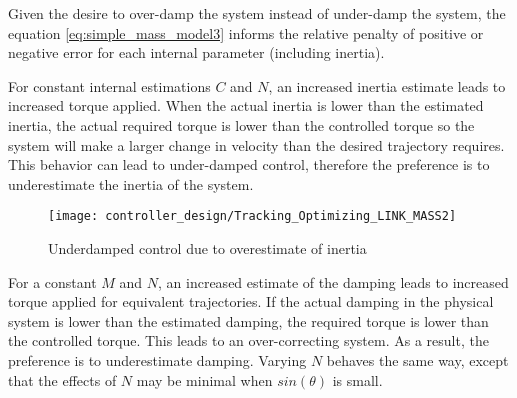 Given the desire to over-damp the system instead of under-damp the system, the
equation \ref{eq:simple_mass_model3} informs the relative penalty of positive or negative error for
each internal parameter (including inertia).

For constant internal estimations $C$ and $N$, an increased inertia estimate leads to increased torque
applied. When the actual inertia is lower than the estimated inertia, the actual required torque is lower 
than the controlled torque so the system will make a larger change in velocity 
than the desired trajectory requires. This behavior can lead to under-damped 
control, therefore the preference is to underestimate the inertia of the system.

\begin{figure}
\centering
\texttt{[image: controller\_design/Tracking\_Optimizing\_LINK\_MASS2]}
\caption{Underdamped control due to overestimate of inertia}
\label{fig:UnderdampedControl}
\end{figure}


For a constant $M$ and $N$, an increased estimate of the damping leads to 
increased torque applied for equivalent trajectories. If the actual damping in the physical system is lower than the estimated damping, the required
torque is lower than the controlled torque. This leads to an over-correcting
system. As a result, the preference is to underestimate damping. Varying $N$ behaves the same way, except that the effects of $N$ may be
minimal when $sin(\theta)$ is small.

